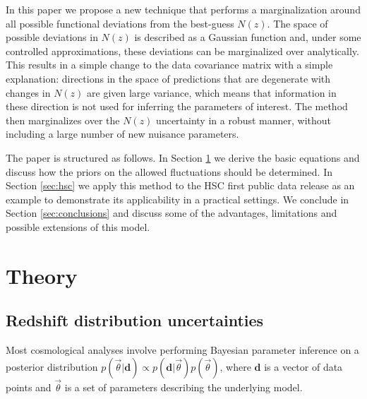 \documentclass[a4paper,11pt]{article}
\newcommand{\vd}{\mathbf{d}}
\begin{document}
    In this paper we propose a new technique that performs a marginalization around all possible functional deviations from the best-guess $N(z)$. The space of possible deviations in $N(z)$ is described as a Gaussian function and, under some controlled approximations, these deviations can be marginalized over analytically. This results in a simple change to the data covariance matrix with a simple explanation: directions in the space of predictions that are degenerate with changes in $N(z)$ are given large variance, which means that information in these direction is not used for inferring the parameters of interest. The method then marginalizes over the $N(z)$ uncertainty in a robust manner, without including a large number of new nuisance parameters.

    The paper is structured as follows. In Section \ref{sec:theory} we derive the basic equations and discuss how the priors on the allowed fluctuations should be determined. In Section \ref{sec:hsc} we  apply this method to the HSC first public data release as an example to demonstrate its applicability in a practical settings. We conclude in Section \ref{sec:conclusions} and discuss some of the advantages, limitations and possible extensions of this model. 


  \section{Theory}\label{sec:theory}
    \subsection{Redshift distribution uncertainties}\label{ssec:theory.nz}
      Most cosmological analyses involve performing Bayesian parameter inference on a posterior distribution $p(\vec{\theta} |\vd) \propto p(\vd|\vec{\theta}) p(\vec{\theta})$, where $\vd$ is a vector of data points and $\vec{\theta}$ is a set of parameters describing the underlying model.
      
\end{document}
